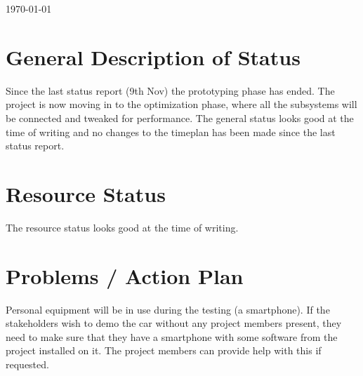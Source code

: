\documentclass[11pt, titlepage]{article} %
\begin{document}
\begin{titlepage}
	
	
	\vfill\vfill\vfill %
	
	{\large\today} %
	
	
	 
	
	\vfill %
	
\end{titlepage}
\fi


\section*{General Description of Status}
Since the last status report (9th Nov) the prototyping phase has ended. The project is now moving
in to the optimization phase, where all the subsystems will be connected and tweaked for performance.
The general status looks good at the time of writing and no changes to the timeplan has been made since
the last status report.

\section*{Resource Status}
The resource status looks good at the time of writing.

\section*{Problems / Action Plan}
Personal equipment will be in use during the testing (a smartphone). If the stakeholders
wish to demo the car without any project members present, they need to make sure that they
have a smartphone with some software from the project installed on it. The project members
can provide help with this if requested.
\end{document}
